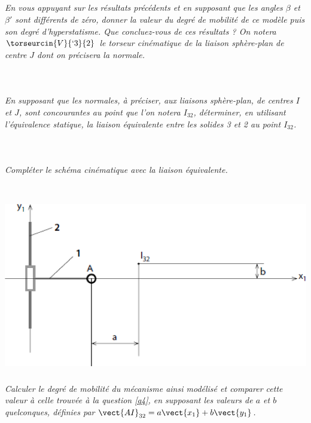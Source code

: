 \documentclass[10pt,fleqn]{article} %
\begin{document}
\begin{multicols}{2}
\subparagraph{\label{q4}}\textit{En vous appuyant sur les résultats précédents et en supposant que les angles $\beta$ et $\beta'$ sont différents de zéro, donner la valeur du degré de mobilité de ce modèle puis son degré d'hyperstatisme. Que concluez-vous de ces résultats ? On notera $\torseurcin{V}{`3}{2}$ le torseur cinématique de la liaison sphère-plan de centre $J$ dont on précisera la normale.}
\ifprof
\begin{corrige}~\\
\end{corrige}
\else
\fi

\subparagraph{}\textit{En supposant que les normales, à préciser, aux liaisons sphère-plan, de centres $I$ et $J$, sont concourantes au point que l'on notera $I_{32}$, déterminer, en utilisant l'équivalence statique, la liaison équivalente entre les solides 3 et 2 au point $I_{32}$.}
\ifprof
\begin{corrige}~\\
\end{corrige}
\else
\fi

\subparagraph{}\textit{Compléter le schéma cinématique avec la liaison équivalente.}
\ifprof
\begin{corrige}~\\
\end{corrige}
\else
\fi
\begin{center}
\includegraphics[width=\linewidth]{images/fig_04}
\end{center}

\subparagraph{}\textit{Calculer le degré de mobilité du mécanisme ainsi modélisé et comparer cette valeur à celle trouvée à la question \ref{q4}, en supposant les valeurs de $a$ et $b$ quelconques, définies par $\vect{AI}_{32}=a\vect{x_1}+b\vect{y_1}$.}
\ifprof
\begin{corrige}~\\
\end{corrige}
\else
\fi


\end{multicols}
\end{document}
